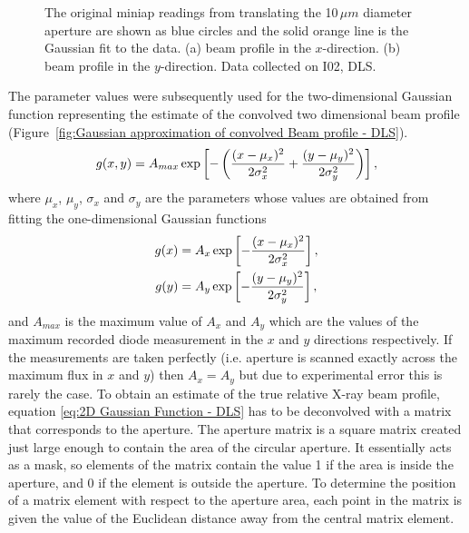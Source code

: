 \begin{figure}
\begin{subfigure}[b]{1.0\textwidth}
                \caption{}
                \label{figfity}
        \end{subfigure}
        \caption[Aperture scan measurements and the Gaussian fits to the data.]{The original miniap readings from translating the 10$\,\mu m$ diameter aperture are shown as blue circles and the solid orange line is the Gaussian fit to the data.
        (a) beam profile in the $x$-direction.
        (b) beam profile in the $y$-direction.
        Data collected on I02, DLS.}
        \label{figgfit}
\end{figure}
The parameter values were subsequently used for the two-dimensional Gaussian function representing the estimate of the convolved two dimensional beam profile (Figure~\ref{fig:Gaussian approximation of convolved Beam profile - DLS}).
\begin{equation}
g(x,y) = A_{max}\exp\left[-\left(\frac{(x - \mu_x)^2}{2\sigma_x^2} + \frac{(y - \mu_y)^2}{2\sigma_y^2}\right)\right],
\label{eq:2D Gaussian Function - DLS}
\end{equation}
where $\mu_x$, $\mu_y$, $\sigma_x$ and $\sigma_y$ are the parameters whose values are obtained from fitting the one-dimensional Gaussian functions
\begin{align}
g(x) &= A_{x}\exp\left[-\frac{(x - \mu_x)^2}{2\sigma_x^2}\right], \label{eq:1D Guassian Function x} \\
g(y) &= A_{y}\exp\left[-\frac{(y - \mu_y)^2}{2\sigma_y^2}\right], \label{eq:1D Guassian Function y}
\end{align}
and $A_{max}$ is the maximum value of $A_{x}$ and $A_{y}$ which are the values of the maximum recorded diode measurement in the $x$ and $y$ directions respectively.
If the measurements are taken perfectly (i.e. aperture is scanned exactly across the maximum flux in $x$ and $y$) then $A_{x} = A_{y}$ but due to experimental error this is rarely the case.
\newline
To obtain an estimate of the true relative X-ray beam profile, equation \ref{eq:2D Gaussian Function - DLS} has to be deconvolved with a matrix that corresponds to the aperture.
The aperture matrix is a square matrix created just large enough to contain the area of the circular aperture.
It essentially acts as a mask, so elements of the matrix contain the value 1 if the area is inside the aperture, and 0 if the element is outside the aperture.
To determine the position of a matrix element with respect to the aperture area, each point in the matrix is given the value of the Euclidean distance away from the central matrix element.
